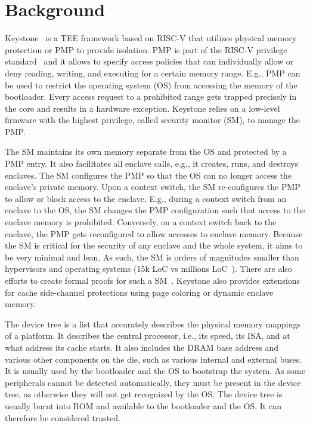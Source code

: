 \section{Background}
\label{sec:background}

Keystone~\cite{keystone} is a TEE framework based on RISC-V that utilizes physical memory protection or PMP to provide isolation. PMP is part of the RISC-V privilege standard~\cite{riscv2019privspec} and it allows to specify access policies that can individually allow or deny reading, writing, and executing for a certain memory range. E.g., PMP can be used to restrict the operating system (OS) from accessing the memory of the bootloader. Every access request to a prohibited range gets trapped precisely in the core and results in a hardware exception. Keystone relies on a low-level firmware with the highest privilege, called security monitor (SM), to manage the PMP. 

The SM maintains its own memory separate from the OS and protected by a PMP entry. It also facilitates all enclave calls, e.g., it creates, runs, and destroys enclaves. The SM configures the PMP so that the OS can no longer access the enclave's private memory. Upon a context switch, the SM re-configures the PMP to allow or block access to the enclave. E.g., during a context switch from an enclave to the OS, the SM changes the PMP configuration such that access to the enclave memory is prohibited. Conversely, on a context switch back to the enclave, the PMP gets reconfigured to allow accesses to enclave memory. 
Because the SM is critical for the security of any enclave and the whole system, it aims to be very minimal and lean. As such, the SM is orders of magnitudes smaller than hypervisors and operating systems (15k LoC vs millions LoC~\cite{torvalds2020linux,barham2003xen}). There are also efforts to create formal proofs for such a SM~\cite{lebedev2019sanctorum}. Keystone also provides extensions for cache side-channel protections using page coloring or dynamic enclave memory. 

The device tree is a list that accurately describes the physical memory mappings of a platform. It describes the central processor, i.e., its speed, its ISA, and at what address its cache starts. It also includes the DRAM base address and various other components on the die, such as various internal and external buses. It is usually used by the bootloader and the OS to bootstrap the system. As some peripherals cannot be detected automatically, they must be present in the device tree, as otherwise they will not get recognized by the OS. The device tree is usually burnt into ROM and available to the bootloader and the OS. It can therefore be considered trusted.

